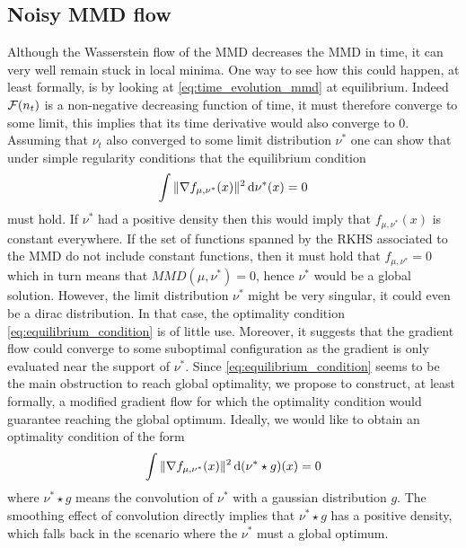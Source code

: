 

\subsection{Noisy MMD flow}

Although the Wasserstein flow of the MMD decreases the MMD in time, it can very well remain stuck in local minima. One way to see how this could happen, at least formally, is by looking at \cref{eq:time_evolution_mmd} at equilibrium. Indeed ${{\mathcal F}}(n_t)$ is a non-negative decreasing function of time, it must therefore converge to some limit, this implies that its time derivative would also converge to $0$. Assuming that $\nu_t$ also converged to some limit distribution $\nu^{*}$ one can show that under simple regularity conditions that the equilibrium condition
\begin{align}\label{eq:equilibrium_condition}
	\int \Vert \nabla f_{\mu,\nu^{*}}(x)\Vert^2 \mathop{}\!\mathrm{d} \nu^{*}(x) =0  
\end{align} 
must hold. If $\nu^*$ had a positive density then this would imply that $f_{\mu,\nu^{*}}(x)$ is constant everywhere. If the set of functions spanned by the RKHS associated to the MMD do not include constant functions, then it must hold that $f_{\mu,\nu^{*}}=0$ which in turn means that $MMD(\mu,\nu^{*})=0$, hence $\nu^*$ would be a global solution. However, the limit distribution $\nu^*$  might be very singular, it could even be a dirac distribution. In that case, the optimality condition \cref{eq:equilibrium_condition} is of little use. Moreover, it suggests that the gradient flow could converge to some suboptimal configuration as the gradient is only evaluated near the support of $\nu^*$.
Since \cref{eq:equilibrium_condition} seems to be the main obstruction to reach global optimality, we propose to construct, at least formally, a modified gradient flow for which the optimality condition would guarantee reaching the global optimum.
Ideally, we would like to obtain an optimality condition of the form
\begin{align}\label{eq:soothed_equilibrium_condition}
	\int \Vert \nabla f_{\mu,\nu^{*}}(x)\Vert^2 \mathop{}\!\mathrm{d} (\nu^{*}\star g)(x) =0  
\end{align}
where $\nu^{*}\star g$ means the convolution of $\nu^*$ with a gaussian distribution $g$. The smoothing effect of convolution directly implies that $\nu^{*}\star g$ has a positive density, which falls back in the scenario where the $\nu^*$ must a global optimum.
